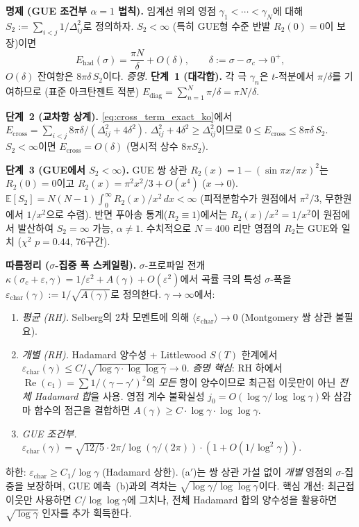 \documentclass[11pt, a4paper]{article}
\theoremstyle{definition}
\theoremstyle{plain}
\begin{document}
\begin{enumerate}
\smallskip\noindent
\textbf{명제 (GUE 조건부 $\alpha=1$ 법칙).}\;
임계선 위의 영점 $\gamma_1<\cdots<\gamma_N$에 대해
$S_2:=\sum_{i<j}1/\Delta_{ij}^{2}$로 정의하자.
$S_2<\infty$ (특히 GUE형 수준 반발 $R_2(0)=0$이 보장)이면
\[
  E_{\mathrm{had}}(\sigma)
    = \frac{\pi N}{\delta} + O(\delta),
  \qquad \delta:=\sigma-\sigma_c\to 0^{+},
\]
$O(\delta)$ 잔여항은 $8\pi\delta\,S_2$이다.
\emph{증명.}\;
\textbf{단계~1 (대각합).}
각 극 $\gamma_n$은 $t$-적분에서 $\pi/\delta$를 기여하므로 (표준 아크탄젠트 적분)
$E_{\mathrm{diag}}=\sum_{n=1}^{N}\pi/\delta=\pi N/\delta$.

\textbf{단계~2 (교차항 상계).}
\eqref{eq:cross_term_exact_ko}에서
$E_{\mathrm{cross}}=\sum_{i<j}8\pi\delta/(\Delta_{ij}^{2}+4\delta^{2})$.
$\Delta_{ij}^{2}+4\delta^{2}\geq\Delta_{ij}^{2}$이므로
$0\leq E_{\mathrm{cross}}\leq 8\pi\delta\,S_2$.
$S_2<\infty$이면 $E_{\mathrm{cross}}=O(\delta)$ (명시적 상수 $8\pi S_2$).

\textbf{단계~3 (GUE에서 $S_2<\infty$).}
GUE 쌍 상관 $R_2(x)=1-(\sin\pi x/\pi x)^{2}$는 $R_2(0)=0$이고
$R_2(x)=\pi^{2}x^{2}/3+O(x^{4})$ ($x\to 0$).
$\mathbb{E}[S_2]=N(N{-}1)\int_{0}^{\infty}R_2(x)/x^{2}\,dx<\infty$
(피적분함수가 원점에서 $\pi^{2}/3$, 무한원에서 $1/x^{2}$으로 수렴).
반면 푸아송 통계($R_2\equiv 1$)에서는 $R_2(x)/x^{2}=1/x^{2}$이
원점에서 발산하여 $S_2=\infty$ 가능, $\alpha\neq 1$.
수치적으로 $N=400$ 리만 영점의 $R_2$는 GUE와 일치
($\chi^{2}$ $p=0.44$, 76구간).
\end{enumerate}

\smallskip\noindent
\textbf{따름정리 ($\sigma$-집중 폭 스케일링).}\;
$\sigma$-프로파일 전개 $\kappa(\sigma_c{+}\varepsilon,\gamma) = 1/\varepsilon^2 + A(\gamma) + O(\varepsilon^2)$에서
곡률 극의 특성 $\sigma$-폭을 $\varepsilon_{\mathrm{char}}(\gamma):=1/\sqrt{A(\gamma)}$로 정의한다.
$\gamma\to\infty$에서:
\begin{enumerate}
\item[(a)] \emph{평균 (RH).}\; Selberg의 2차 모멘트에 의해 $\langle\varepsilon_{\mathrm{char}}\rangle\to 0$
  (Montgomery 쌍 상관 불필요).
\item[(a$'$)] \emph{개별 (RH).}\; Hadamard 양수성 + Littlewood $S(T)$ 한계에서
  $\varepsilon_{\mathrm{char}}(\gamma) \le C/\sqrt{\log\gamma\cdot\log\log\gamma} \to 0$.
  \emph{증명 핵심}: RH 하에서 $\operatorname{Re}(c_1) = \sum 1/(\gamma-\gamma')^2$의 \emph{모든} 항이
  양수이므로 최근접 이웃만이 아닌 \emph{전체 Hadamard 합}을 사용.
  영점 계수 불확실성 $j_0 = O(\log\gamma/\log\log\gamma)$와 삼감마 함수의
  점근을 결합하면 $A(\gamma) \ge C\cdot\log\gamma\cdot\log\log\gamma$.
\item[(b)] \emph{GUE 조건부.}\;
  $\varepsilon_{\mathrm{char}}(\gamma) = \sqrt{12/5}\cdot 2\pi/\log(\gamma/(2\pi))\cdot(1+O(1/\log^2\gamma))$.
\end{enumerate}
\noindent
하한: $\varepsilon_{\mathrm{char}}\ge C_1/\log\gamma$ (Hadamard 상한).
(a$'$)는 쌍 상관 가설 없이 \emph{개별} 영점의 $\sigma$-집중을 보장하며,
GUE 예측~(b)과의 격차는 $\sqrt{\log\gamma/\log\log\gamma}$이다.
핵심 개선: 최근접 이웃만 사용하면 $C/\log\log\gamma$에 그치나,
전체 Hadamard 합의 양수성을 활용하면 $\sqrt{\log\gamma}$ 인자를 추가 획득한다.
\end{document}
